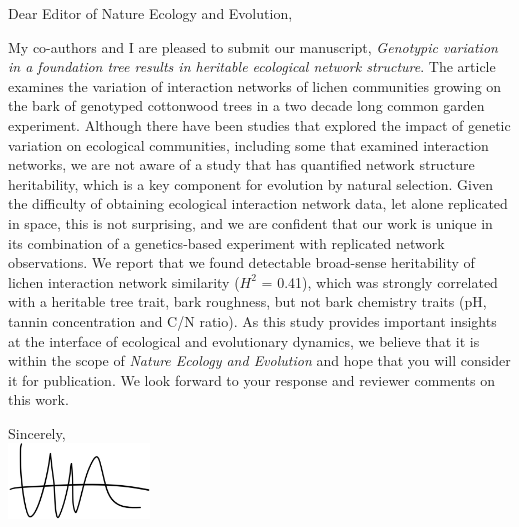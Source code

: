 \documentclass[12pt, a4paper]{letter} %
\begin{document}

\begin{letter}{

}


\opening{Dear Editor of Nature Ecology and Evolution,}


My co-authors and I are pleased to submit our manuscript,
\textit{Genotypic variation in a foundation tree results in heritable
  ecological network structure}. The article examines the variation of
interaction networks of lichen communities growing on the bark of
genotyped cottonwood trees in a two decade long common garden
experiment. Although there have been studies that explored the impact
of genetic variation on ecological communities, including some that
examined interaction networks, we are not aware of a study that has
quantified network structure heritability, which is a key component
for evolution by natural selection. Given the difficulty of obtaining
ecological interaction network data, let alone replicated in space,
this is not surprising, and we are confident that our work is unique
in its combination of a genetics-based experiment with replicated
network observations. We report that we found detectable broad-sense
heritability of lichen interaction network similarity ($H^2$ = 0.41),
which was strongly correlated with a heritable tree trait, bark
roughness, but not bark chemistry traits (pH, tannin concentration and
C/N ratio). As this study provides important insights at the interface
of ecological and evolutionary dynamics, we believe that it is within
the scope of \textit{Nature Ecology and Evolution} and hope that you
will consider it for publication. We look forward to your response and
reviewer comments on this work.


\closing{Sincerely, \\
  \hbox{\hspace{-10cm}}
\includegraphics[height=2cm]{mkl_sig.pdf}  
}




\end{letter}
\end{document}
